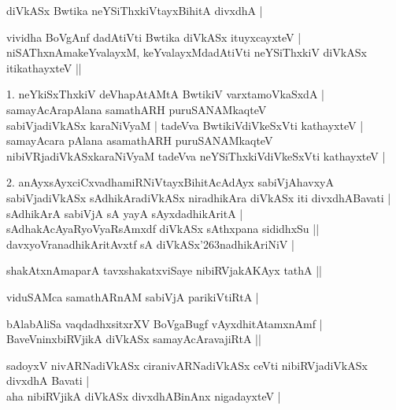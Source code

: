 \begin{entry}
\gl{}
\info{}{}{}{}
\begin{shl}
diVkASx Bwtika neYSiThxkiVtayxBihitA divxdhA |
\end{shl}
\begin{shl}
vividha BoVgAnf dadAtiVti Bwtika diVkASx ituyxcayxteV |\\
niSAThxnAmakeYvalayxM, keYvalayxMdadAtiVti neYSiThxkiV diVkASx itikathayxteV ||
\end{shl}
\begin{shl}
1. neYkiSxThxkiV deVhapAtAMtA BwtikiV varxtamoVkaSxdA |\\
samayAcArapAlana samathARH puruSANAMkaqteV\\
sabiVjadiVkASx karaNiVyaM | tadeVva BwtikiVdiVkeSxVti kathayxteV |\\
samayAcara pAlana asamathARH puruSANAMkaqteV\\
nibiVRjadiVkASxkaraNiVyaM tadeVva neYSiThxkiVdiVkeSxVti kathayxteV |
\end{shl}
\begin{shl}
2. anAyxsAyxciCxvadhamiRNiVtayxBihitAcAdAyx sabiVjAhavxyA\\
sabiVjadiVkASx sAdhikAradiVkASx niradhikAra diVkASx iti divxdhABavati |\\
sAdhikArA sabiVjA sA yayA sAyxdadhikAritA |\\
sAdhakAcAyaRyoVyaRsAmxdf diVkASx sAthxpana sididhxSu ||\\
davxyoVranadhikAritAvxtf sA diVkASx\char'263nadhikAriNiV |
\end{shl}
\begin{shl}
shakAtxnAmaparA tavxshakatxviSaye nibiRVjakAKAyx tathA ||
\end{shl}
\begin{shl}
viduSAMca samathARnAM sabiVjA parikiVtiRtA |
\end{shl}
\begin{shl}
bAlabAliSa vaqdadhxsitxrXV BoVgaBugf vAyxdhitAtamxnAmf |\\
BaveVninxbiRVjikA diVkASx samayAcAravajiRtA || 
\end{shl}
\begin{shl}
sadoyxV nivARNadiVkASx ciranivARNadiVkASx ceVti nibiRVjadiVkASx divxdhA Bavati |\\
aha nibiRVjikA diVkASx divxdhABinAnx nigadayxteV |\\

\end{shl}
\end{entry}
